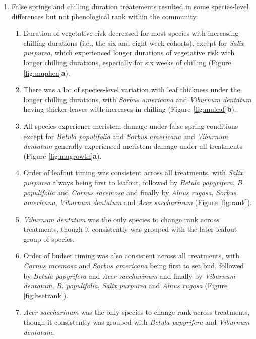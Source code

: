 \documentclass{article}\usepackage[]{graphicx}\usepackage[]{color}
\begin{document}
\begin{enumerate}
\item False springs and chilling duration treatements resulted in some species-level differences but not phenological rank within the community.
  \begin{enumerate}
  \item Duration of vegetative risk decreased for most species with increasing chilling durations (i.e., the six and eight week cohorts), except for \textit{Salix purpurea}, which experienced longer durations of vegetative risk with longer chilling durations, especially for six weeks of chilling (Figure \ref{fig:muphen}\textbf{a}). 
  \item There was a lot of species-level variation with leaf thickness under the longer chilling durations, with \textit{Sorbus americana} and \textit{Viburnum dentatum} having thicker leaves with increases in chilling (Figure \ref{fig:muleaf}\textbf{b}). 
  \item All species experience meristem damage under false spring conditions except for \textit{Betula populifolia} and \textit{Sorbus americana} and \textit{Viburnum dentatum} generally experienced meristem damage under all treatments (Figure \ref{fig:mugrowth}\textbf{a}). 
  \item Order of leafout timing was consistent across all treatments, with \textit{Salix purpurea} always being first to leafout, followed by \textit{Betula papyrifera}, \textit{B. populifolia} and \textit{Cornus racemosa} and finally by \textit{Alnus rugosa}, \textit{Sorbus americana}, \textit{Viburnum dentatum} and \textit{Acer saccharinum} (Figure \ref{fig:rank}).
  \item \textit{Viburnum dentatum} was the only species to change rank across treatments, though it consistently was grouped with the later-leafout group of species.
  \item Order of budset timing was also consistent across all treatments, with \textit{Cornus racemosa} and \textit{Sorbus americana} being first to set bud, followed by \textit{Betula papyrifera} and \textit{Acer saccharinum} and finally by \textit{Viburnum dentatum}, \textit{B. populifolia}, \textit{Salix purpurea} and \textit{Alnus rugosa} (Figure \ref{fig:bsetrank}).
  \item \textit{Acer saccharinum} was the only species to change rank across treatments, though it consistently was grouped with \textit{Betula papyrifera} and \textit{Viburnum dentatum}.
  \end{enumerate}
\end{enumerate}
\end{document}

